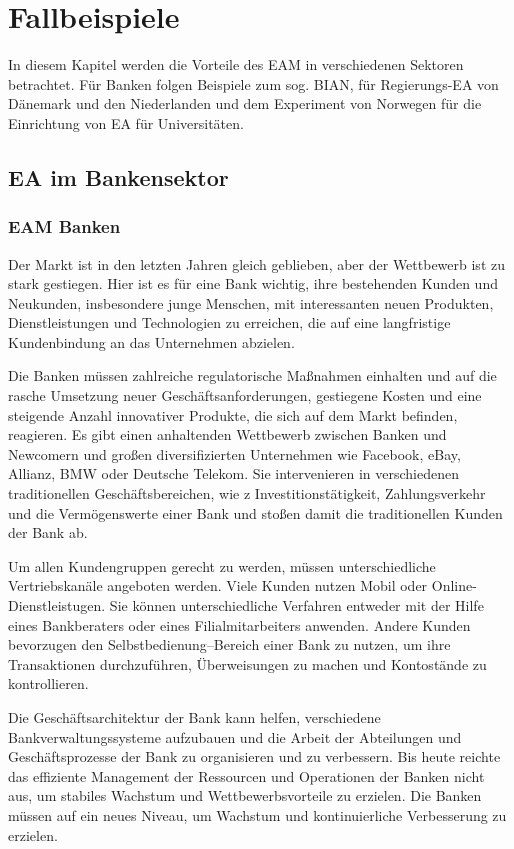 \documentclass[
	doc,
	a4paper,
	helv
	]{apa6}
\begin{document}
\section{Fallbeispiele}
In diesem Kapitel werden die Vorteile des EAM in verschiedenen Sektoren betrachtet. Für Banken folgen Beispiele zum sog. BIAN, für Regierungs-EA von Dänemark und den Niederlanden und dem Experiment von Norwegen für die Einrichtung von EA für Universitäten.

\subsection{EA im Bankensektor}
\subsubsection{EAM Banken}
Der Markt ist in den letzten Jahren gleich geblieben, aber der Wettbewerb ist zu stark gestiegen. Hier ist es für eine Bank wichtig, ihre bestehenden Kunden und Neukunden, insbesondere junge Menschen, mit interessanten neuen Produkten, Dienstleistungen und Technologien zu erreichen, die auf eine langfristige Kundenbindung an das Unternehmen abzielen.

Die Banken müssen zahlreiche regulatorische Maßnahmen einhalten und auf die rasche Umsetzung neuer Geschäftsanforderungen, gestiegene Kosten und eine steigende Anzahl innovativer Produkte, die sich auf dem Markt befinden, reagieren. Es gibt einen anhaltenden Wettbewerb zwischen Banken und Newcomern und großen diversifizierten Unternehmen wie Facebook, eBay, Allianz, BMW oder Deutsche Telekom. Sie intervenieren in verschiedenen traditionellen Geschäftsbereichen, wie z Investitionstätigkeit, Zahlungsverkehr und die Vermögenswerte einer Bank und stoßen damit die traditionellen Kunden der Bank ab.

Um allen Kundengruppen gerecht zu werden, müssen unterschiedliche Vertriebskanäle angeboten werden. Viele Kunden nutzen Mobil oder Online-Dienstleistugen. Sie können unterschiedliche Verfahren entweder mit der Hilfe eines Bankberaters oder eines Filialmitarbeiters anwenden.
Andere Kunden bevorzugen den  Selbstbedienung--Bereich einer Bank  zu nutzen, um ihre Transaktionen durchzuführen, Überweisungen zu machen und Kontostände zu kontrollieren. 

Die Geschäftsarchitektur der Bank kann helfen, verschiedene Bankverwaltungssysteme aufzubauen und die Arbeit der Abteilungen und Geschäftsprozesse der Bank zu organisieren und zu verbessern. Bis heute reichte das effiziente Management der Ressourcen und Operationen der Banken nicht aus, um stabiles Wachstum und Wettbewerbsvorteile zu erzielen. Die Banken müssen auf ein neues Niveau, um Wachstum und kontinuierliche Verbesserung zu erzielen. \autocite{Kamarianakis2016}
\end{document}
